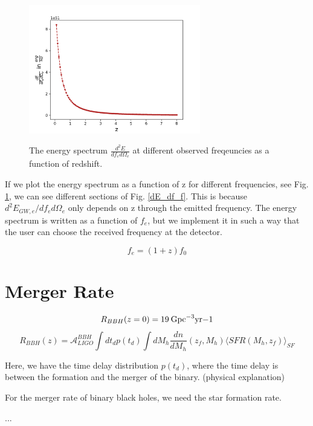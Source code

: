 \begin{figure}[h]
{        \includegraphics[width=7.5cm, clip]{Images/E_spectrum_z_1000Hz.png}}
  
    \caption{The energy spectrum $\frac{d^2E}{df_e d\Omega_e}$ at different observed freqeuncies as a function of redshift.}
    \label{dE_df_diff_frequencies}
\end{figure}

If we plot the energy spectrum as a function of z for different frequencies, see Fig. \ref{dE_df_diff_frequencies}, we can see different sections of Fig. \ref{dE_df_f}. This is because $d^2 E_{GW,e}/df_e d\Omega_e$ only depends on z through the emitted frequency. The energy spectrum is written as a function of $f_e$, but we implement it in such a way that the user can choose the received frequency at the detector.


\begin{equation}
    f_e = (1+z)f_0
\end{equation}

\section{Merger Rate}
\begin{equation}
    R_{BBH}(z=0) = 19 \:\rm{Gpc}^{-3}\rm{yr}{-1}
\end{equation}
\begin{equation}
    R_{BBH}(z)=\mathcal{A}_{LIGO}^{BBH}\int dt_d p(t_d) \int dM_h \frac{dn}{dM_h}(z_f, M_h)\langle SFR(M_h, z_f)\rangle_{SF}
    \label{BBH_merger_equation}
\end{equation}

Here, we have the time delay distribution $p(t_d)$, where the time delay is between the formation and the merger of the binary. (physical explanation)

For the merger rate of binary black holes, we need the star formation rate. 

...

